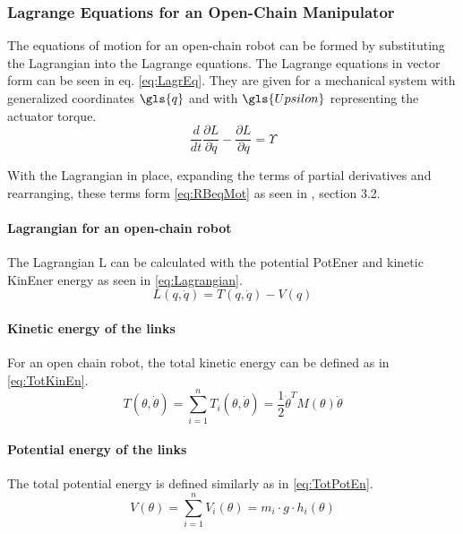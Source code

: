 \subsubsection{Lagrange Equations for an Open-Chain Manipulator}

The equations of motion for an open-chain robot can be formed by substituting the Lagrangian into the Lagrange equations. 
The Lagrange equations in vector form can be seen in eq. \ref{eq:LagrEq}. They are given for a mechanical system with generalized coordinates $\gls{q}$ and with $\gls{Upsilon}$ representing the actuator torque.
\begin{equation} \label{eq:LagrEq}
\frac{d}{dt}\frac{\partial L}{\partial \dot{q}} - \frac{\partial L}{\partial q} = \Upsilon
\end{equation}

With the Lagrangian in place, expanding the terms of partial derivatives and rearranging, these terms form \ref{eq:RBeqMot} as seen in \cite{MathIntroRobManip}, section 3.2.\\

\paragraph{Lagrangian for an open-chain robot}

The Lagrangian \gls{L} can be calculated with the potential \gls{PotEner} and kinetic \gls{KinEner} energy as seen in \ref{eq:Lagrangian}. 
\begin{equation} \label{eq:Lagrangian}
	L(q,\dot{q}) = T(q,\dot{q}) - V(q)
\end{equation} 



\paragraph{Kinetic energy of the links}
For an open chain robot, the total kinetic energy can be defined as in \ref{eq:TotKinEn}.
\begin{equation}\label{eq:TotKinEn}
T(\theta,\dot{\theta}) = \sum_{i=1}^{n} T_i(\theta,\dot{\theta}) = \frac{1}{2} \dot{\theta}^T M(\theta)\dot{\theta}
\end{equation}

\paragraph{Potential energy of the links}
The total potential energy is defined similarly as in  \ref{eq:TotPotEn}.
\begin{equation}\label{eq:TotPotEn}
V(\theta)=\sum_{i=1}^{n} V_i(\theta) = m_i \cdot g \cdot h_i(\theta)
\end{equation}

